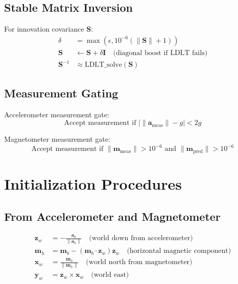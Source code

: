 \documentclass{article}
\newcommand{\vect}[1]{\bm{#1}}
\begin{document}
\subsection{Stable Matrix Inversion}

For innovation covariance $\vect{S}$:
\begin{align}
\delta &= \max(\epsilon, 10^{-6}(\|\vect{S}\| + 1)) \\
\vect{S} &\leftarrow \vect{S} + \delta \vect{I} \quad \text{(diagonal boost if LDLT fails)} \\
\vect{S}^{-1} &\approx \text{LDLT\_solve}(\vect{S})
\end{align}

\subsection{Measurement Gating}

Accelerometer measurement gate:
\begin{equation}
\text{Accept measurement if } |\|\vect{a}_{\text{meas}}\| - g| < 2g
\end{equation}

Magnetometer measurement gate:
\begin{equation}
\text{Accept measurement if } \|\vect{m}_{\text{meas}}\| > 10^{-6} \text{ and } \|\vect{m}_{\text{pred}}\| > 10^{-6}
\end{equation}

\section{Initialization Procedures}

\subsection{From Accelerometer and Magnetometer}

\begin{align}
\vect{z}_w &= -\frac{\vect{a}_b}{\|\vect{a}_b\|} \quad \text{(world down from accelerometer)} \\
\vect{m}_h &= \vect{m}_b - (\vect{m}_b \cdot \vect{z}_w)\vect{z}_w \quad \text{(horizontal magnetic component)} \\
\vect{x}_w &= \frac{\vect{m}_h}{\|\vect{m}_h\|} \quad \text{(world north from magnetometer)} \\
\vect{y}_w &= \vect{z}_w \times \vect{x}_w \quad \text{(world east)}
\end{align}
\end{document}

